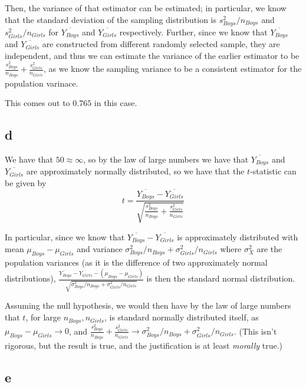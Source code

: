 \documentclass[12pt,letterpaper]{article}
\theoremstyle{definition}
\begin{document}
Then, the variance of that estimator can be estimated; in particular, we know that the standard deviation of the sampling distribution is $s^{2}_{Boys} / n_{Boys}$ and $s^{2}_{{Girls}} / n_{{Girls}}$ for $\overline{Y_{Boys}}$ and $\overline{Y_{Girls}}$ respectively. Further, since we know that $\overline{Y_{Boys}}$ and $\overline{Y_{Girls}}$ are constructed from different randomly selected sample, they are independent, and thus we can estimate the variance of the earlier estimator to be $\frac{s^{2}_{{Boys}}}{n_{{Boys}}} + \frac{s^{2}_{{Girls}}}{n_{{Girls}}}$, as we know the sampling variance to be a consistent estimator for the population varinace.

This comes out to $0.765$ in this case.

\subsection*{d}

We have that $50 \approx \infty$, so by the law of large numbers we have that $\overline{Y_{Boys}}$ and $\overline{Y_{Girls}}$ are approximately normally distributed, so we have that the $t$-statistic can be given by
\[
  t = \frac{\overline{Y_{Boys}} - \overline{Y_{Girls}}}{\sqrt{\frac{s^{2}_{{Boys}}}{n_{{Boys}}} + \frac{s^{2}_{{Girls}}}{n_{{Girls}}}}}
\]

In particular, since we know that $\overline{Y_{Boys}} - \overline{Y_{Girls}}$ is approximately distributed with mean $\mu_{{Boys}} - \mu_{Girls}$ and variance $\sigma^{2}_{Boys} / n_{Boys} + \sigma^{2}_{Girls} / n_{Girls}$  where $\sigma^{2}_{X}$ are the population variances (as it is the difference of two approximately normal distributions), $\frac{\overline{Y_{Boys}} - \overline{Y_{Girls}} - (\mu_{{Boys}} - \mu_{Girls})}{\sqrt{\sigma^{2}_{Boys} / n_{Boys} + \sigma^{2}_{Girls} / n_{Girls}}}$ is then the standard normal distribution.

Assuming the null hypothesis, we would then have by the law of large numbers that $t$, for large $n_{Boys}, n_{Girls}$, is standard normally distributed itself, as $\mu_{Boys} - \mu_{Girls} \rightarrow 0$, and $\frac{s^{2}_{{Boys}}}{n_{{Boys}}} + \frac{s^{2}_{{Girls}}}{n_{{Girls}}} \rightarrow \sigma^{2}_{Boys} / n_{Boys} + \sigma^{2}_{Girls} / n_{Girls}$. (This isn't rigorous, but the result is true, and the justification is at least \textit{morally} true.)

\subsection*{e}
\end{document}
